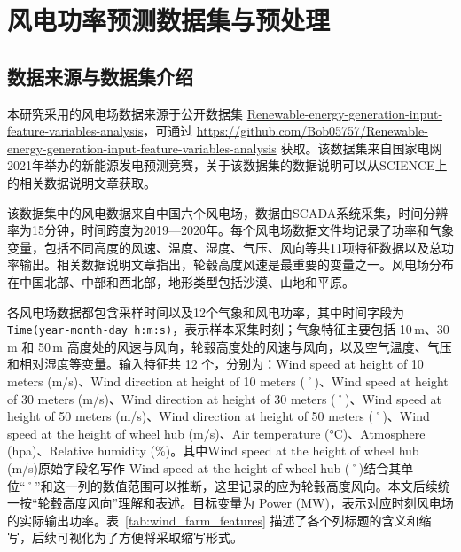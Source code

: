 \section{风电功率预测数据集与预处理}

\subsection{数据来源与数据集介绍}

\begin{sloppypar}
本研究采用的风电场数据来源于公开数据集 \url{Renewable-energy-generation-input-feature-variables-analysis}，可通过 \url{https://github.com/Bob05757/Renewable-energy-generation-input-feature-variables-analysis} 获取。该数据集来自国家电网2021年举办的新能源发电预测竞赛，关于该数据集的数据说明可以从SCIENCE上的相关数据说明文章获取\cite{chen_solar_2022}。

该数据集中的风电数据来自中国六个风电场，数据由SCADA系统采集，时间分辨率为15分钟，时间跨度为2019—2020年。每个风电场数据文件均记录了功率和气象变量，包括不同高度的风速、温度、湿度、气压、风向等共11项特征数据以及总功率输出。相关数据说明文章指出，轮毂高度风速是最重要的变量之一。风电场分布在中国北部、中部和西北部，地形类型包括沙漠、山地和平原。

各风电场数据都包含采样时间以及12个气象和风电功率，其中时间字段为 \texttt{Time(year-month-day h:m:s)}，表示样本采集时刻；气象特征主要包括 10\,m、30\,m 和 50\,m 高度处的风速与风向，轮毂高度处的风速与风向，以及空气温度、气压和相对湿度等变量。输入特征共 12 个，分别为：Wind speed at height of 10 meters (m/s)、Wind direction at height of 10 meters (˚)、Wind speed at height of 30 meters (m/s)、Wind direction at height of 30 meters (˚)、Wind speed at height of 50 meters (m/s)、Wind direction at height of 50 meters (˚)、Wind speed at the height of wheel hub (m/s)、Air temperature (°C)、Atmosphere (hpa)、Relative humidity (\%)。其中Wind speed at the height of wheel hub (m/s)原始字段名写作 Wind speed at the height of wheel hub (˚)结合其单位“˚”和这一列的数值范围可以推断，这里记录的应为轮毂高度风向。本文后续统一按“轮毂高度风向”理解和表述。目标变量为 Power (MW)，表示对应时刻风电场的实际输出功率。表~\ref{tab:wind_farm_features} 描述了各个列标题的含义和缩写，后续可视化为了方便将采取缩写形式。


\end{sloppypar}
